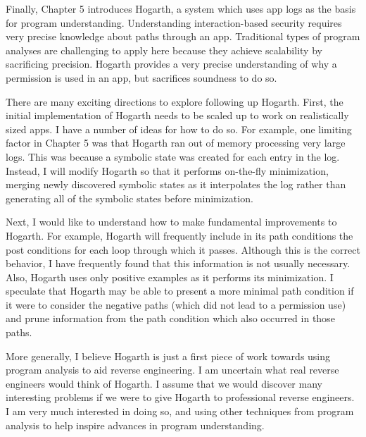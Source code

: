Finally, Chapter 5 introduces Hogarth, a system which uses app logs as
the basis for program understanding. Understanding interaction-based
security requires very precise knowledge about paths through an
app. Traditional types of program analyses are challenging to apply
here because they achieve scalability by sacrificing
precision. Hogarth provides a very precise understanding of why a
permission is used in an app, but sacrifices soundness to do so.

There are many exciting directions to explore following up
Hogarth. First, the initial implementation of Hogarth needs to be
scaled up to work on realistically sized apps. I have a number of
ideas for how to do so. For example, one limiting factor in Chapter 5
was that Hogarth ran out of memory processing very large logs. This
was because a symbolic state was created for each entry in the
log. Instead, I will modify Hogarth so that it performs on-the-fly
minimization, merging newly discovered symbolic states as it
interpolates the log rather than generating all of the symbolic states
before minimization.

Next, I would like to understand how to make fundamental improvements
to Hogarth. For example, Hogarth will frequently include in its path
conditions the post conditions for each loop through which it
passes. Although this is the correct behavior, I have frequently found
that this information is not usually necessary. Also, Hogarth uses
only positive examples as it performs its minimization. I speculate
that Hogarth may be able to present a more minimal path condition if
it were to consider the negative paths (which did not lead to a
permission use) and prune information from the path condition which
also occurred in those paths.

More generally, I believe Hogarth is just a first piece of work
towards using program analysis to aid reverse engineering. I am
uncertain what real reverse engineers would think of Hogarth. I assume
that we would discover many interesting problems if we were to give
Hogarth to professional reverse engineers. I am very much interested
in doing so, and using other techniques from program analysis to help
inspire advances in program understanding.

